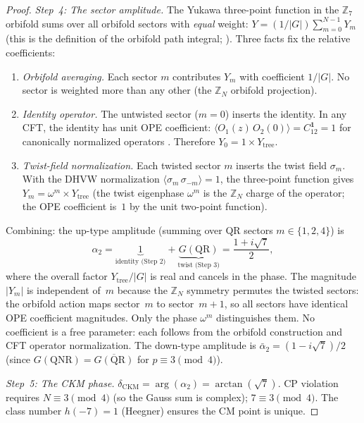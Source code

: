 \begin{proof}
\emph{Step~4: The sector amplitude.}
The Yukawa three-point function in the $\mathbb{Z}_7$ orbifold
sums over all orbifold sectors with \emph{equal} weight:
$Y = (1/|G|)\sum_{m=0}^{N-1} Y_m$
(this is the definition of the orbifold path integral;
\citealt{DixonHarveyVafaWitten1985}).
Three facts fix the relative coefficients:
\begin{enumerate}
\item \emph{Orbifold averaging.}
  Each sector $m$ contributes $Y_m$ with coefficient $1/|G|$.
  No sector is weighted more than any other
  (the $\mathbb{Z}_N$ orbifold projection).
\item \emph{Identity operator.}
  The untwisted sector ($m = 0$) inserts the identity.
  In any CFT, the identity has unit OPE coefficient:
  $\langle O_1(z)\,O_2(0)\rangle = C_{12}^{\mathbf{1}} = 1$
  for canonically normalized operators
  \citep{Polchinski1998}.
  Therefore $Y_0 = 1 \times Y_{\mathrm{tree}}$.
\item \emph{Twist-field normalization.}
  Each twisted sector $m$ inserts the twist field $\sigma_m$.
  With the DHVW normalization
  $\langle\sigma_m\,\sigma_{-m}\rangle = 1$,
  the three-point function gives
  $Y_m = \omega^m \times Y_{\mathrm{tree}}$
  (the twist eigenphase $\omega^m$ is the $\mathbb{Z}_N$
  charge of the operator; the OPE coefficient is~$1$
  by the unit two-point function).
\end{enumerate}
Combining: the up-type amplitude (summing over QR sectors
$m \in \{1,2,4\}$) is
\[
  \alpha_2 = \underbrace{1}_{\text{identity (Step~2)}}
  + \underbrace{G(\mathrm{QR})}_{\text{twist (Step~3)}}
  = \frac{1 + i\sqrt{7}}{2},
\]
where the overall factor $Y_{\mathrm{tree}}/|G|$ is real
and cancels in the phase.
The magnitude $|Y_m|$ is independent of~$m$ because
the $\mathbb{Z}_N$ symmetry permutes the twisted sectors:
the orbifold action maps sector~$m$ to sector~$m{+}1$,
so all sectors have identical OPE coefficient magnitudes.
Only the phase $\omega^m$ distinguishes them.
No coefficient is a free parameter: each follows from
the orbifold construction and CFT operator normalization.
The down-type amplitude is $\bar\alpha_2 = (1 - i\sqrt{7})/2$
(since $G(\mathrm{QNR}) = \overline{G(\mathrm{QR})}$
for $p \equiv 3 \pmod{4}$).

\emph{Step~5: The CKM phase.}
$\delta_{\mathrm{CKM}} = \arg(\alpha_2) = \arctan(\sqrt{7})$.
CP violation requires $N \equiv 3 \pmod{4}$ (so the Gauss sum
is complex); $7 \equiv 3 \pmod{4}$.
The class number $h(-7) = 1$ (Heegner) ensures the CM point is unique.
\end{proof}

